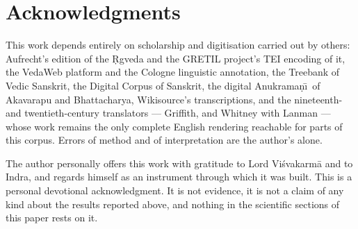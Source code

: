 \section*{Acknowledgments}

This work depends entirely on scholarship and digitisation carried out by others:
Aufrecht's edition of the \d{R}gveda and the GRETIL project's TEI encoding of it, the
VedaWeb platform and the Cologne linguistic annotation, the Treebank of Vedic
Sanskrit, the Digital Corpus of Sanskrit, the digital Anukrama\d{n}\=\i\ of Akavarapu
and Bhattacharya, Wikisource's transcriptions, and the nineteenth- and
twentieth-century translators --- Griffith, and Whitney with Lanman --- whose work
remains the only complete English rendering reachable for parts of this corpus.
Errors of method and of interpretation are the author's alone.

The author personally offers this work with gratitude to Lord Vi\'svakarm\=a and to
Indra, and regards himself as an instrument through which it was built. This is a
personal devotional acknowledgment. It is not evidence, it is not a claim of any
kind about the results reported above, and nothing in the scientific sections of this
paper rests on it.
